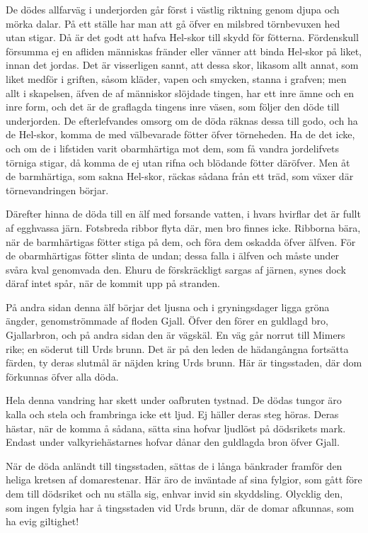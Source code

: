 De dödes allfarväg i underjorden går först i västlig riktning genom
djupa och mörka dalar. På ett ställe har man att gå öfver en milsbred
törnbevuxen hed utan stigar. Då är det godt att hafva Hel-skor till
skydd för fötterna. Fördenskull försumma ej en afliden människas fränder
eller vänner att binda Hel-skor på liket, innan det jordas. Det är
visserligen sannt, att dessa skor, likasom allt annat, som liket medför
i griften, såsom kläder, vapen och smycken, stanna i grafven; men allt i
skapelsen, äfven de af människor slöjdade tingen, har ett inre ämne och
en inre form, och det är de graflagda tingens inre väsen, som följer den
döde till underjorden. De efterlefvandes omsorg om de döda räknas dessa
till godo, och ha de Hel-skor, komma de med välbevarade fötter öfver
törneheden. Ha de det icke, och om de i lifstiden varit obarmhärtiga mot
dem, som få vandra jordelifvets törniga stigar, då komma de ej utan
rifna och blödande fötter däröfver. Men åt de barmhärtiga, som sakna
Hel-skor, räckas sådana från ett träd, som växer där törnevandringen
börjar.

Därefter hinna de döda till en älf med forsande vatten, i hvars hvirflar
det är fullt af egghvassa järn. Fotsbreda ribbor flyta där, men bro
finnes icke. Ribborna bära, när de barmhärtigas fötter stiga på dem, och
föra dem oskadda öfver älfven. För de obarmhärtigas fötter slinta de
undan; dessa falla i älfven och måste under svåra kval genomvada
den. Ehuru de förskräckligt sargas af järnen, synes dock däraf intet
spår, när de kommit upp på stranden.

På andra sidan denna älf börjar det ljusna och i gryningsdager ligga
gröna ängder, genomströmmade af floden Gjall. Öfver den förer en
guldlagd bro, Gjallarbron, och på andra sidan den är vägskäl. En väg går
norrut till Mimers rike; en söderut till Urds brunn. Det är på den leden
de hädangångna fortsätta färden, ty deras slutmål är näjden kring Urds
brunn. Här är tingsstaden, där dom förkunnas öfver alla döda.

Hela denna vandring har skett under oafbruten tystnad. De dödas tungor
äro kalla och stela och frambringa icke ett ljud. Ej häller deras steg
höras. Deras hästar, när de komma å sådana, sätta sina hofvar ljudlöst
på dödsrikets mark. Endast under valkyriehästarnes hofvar dånar den
guldlagda bron öfver Gjall.

När de döda anländt till tingsstaden, sättas de i långa bänkrader
framför den heliga kretsen af domarestenar. Här äro de inväntade af sina
fylgior, som gått före dem till dödsriket och nu ställa sig, enhvar
invid sin skyddsling. Olycklig den, som ingen fylgia har å tingsstaden
vid Urds brunn, där de domar afkunnas, som ha evig giltighet!

